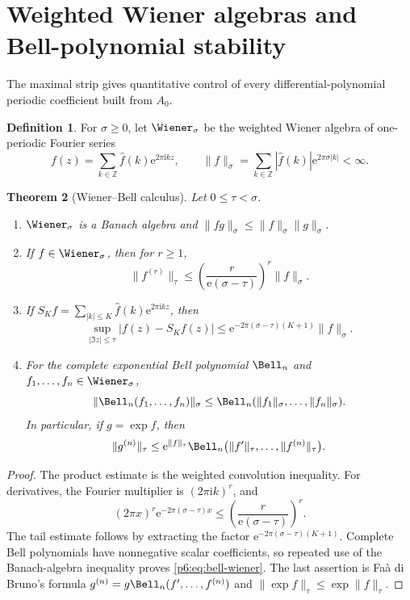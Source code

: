 \documentclass[11pt]{article}
\numberwithin{equation}{section}
\newtheorem{theorem}{Theorem}[section]
\theoremstyle{definition}
\newtheorem{definition}[theorem]{Definition}
\theoremstyle{remark}
\newcommand{\Z}{\mathbb Z}
\newcommand{\e}{\mathrm e}
\newcommand{\ii}{\mathrm i}
\begin{document}
\section{Weighted Wiener algebras and Bell-polynomial stability}
\label{p6:sec:wiener}

The maximal strip gives quantitative control of every differential-polynomial periodic
coefficient built from $A_0$.

\begin{definition}
For $\sigma\ge0$, let $\Wiener_\sigma$ be the weighted Wiener algebra of one-periodic
Fourier series
\[
 f(z)=\sum_{k\in\Z}\widehat f(k)\e^{2\pi\ii kz},
 \qquad
 \|f\|_\sigma=\sum_{k\in\Z}|\widehat f(k)|\e^{2\pi\sigma|k|}<\infty.
\]
\end{definition}

\begin{theorem}[Wiener--Bell calculus]
\label{p6:thm:wiener-bell}
Let $0\le\tau<\sigma$.
\begin{enumerate}
\item $\Wiener_\sigma$ is a Banach algebra and
$\|fg\|_\sigma\le\|f\|_\sigma\|g\|_\sigma$.
\item If $f\in\Wiener_\sigma$, then for $r\ge1$,
\begin{equation}
 \|f^{(r)}\|_\tau
 \le\left(\frac{r}{\e(\sigma-\tau)}\right)^r\|f\|_\sigma.
 \label{p6:eq:derivative-wiener}
\end{equation}
\item If $S_Kf=\sum_{|k|\le K}\widehat f(k)\e^{2\pi\ii kz}$, then
\begin{equation}
 \sup_{|\Im z|\le\tau}|f(z)-S_Kf(z)|
 \le\e^{-2\pi(\sigma-\tau)(K+1)}\|f\|_\sigma.
 \label{p6:eq:fourier-tail-wiener}
\end{equation}
\item For the complete exponential Bell polynomial $\Bell_n$ and
$f_1,\ldots,f_n\in\Wiener_\sigma$,
\begin{equation}
 \|\Bell_n(f_1,\ldots,f_n)\|_\sigma
 \le\Bell_n(\|f_1\|_\sigma,\ldots,\|f_n\|_\sigma).
 \label{p6:eq:bell-wiener}
\end{equation}
In particular, if $g=\exp f$, then
\begin{equation}
 \|g^{(n)}\|_\tau
 \le \e^{\|f\|_\tau}
 \Bell_n\bigl(\|f'\|_\tau,\ldots,\|f^{(n)}\|_\tau\bigr).
 \label{p6:eq:exp-bell-bound}
\end{equation}
\end{enumerate}
\end{theorem}

\begin{proof}
The product estimate is the weighted convolution inequality.  For derivatives, the
Fourier multiplier is $(2\pi\ii k)^r$, and
\[
 (2\pi x)^r\e^{-2\pi(\sigma-\tau)x}
 \le\left(\frac{r}{\e(\sigma-\tau)}\right)^r.
\]
The tail estimate follows by extracting the factor
$\e^{-2\pi(\sigma-\tau)(K+1)}$.  Complete Bell polynomials have nonnegative scalar
coefficients, so repeated use of the Banach-algebra inequality proves
\eqref{p6:eq:bell-wiener}.  The last assertion is Fa\`a di Bruno's formula
$g^{(n)}=g\Bell_n(f',\ldots,f^{(n)})$ and
$\|\exp f\|_\tau\le\exp\|f\|_\tau$.
\end{proof}
\end{document}
